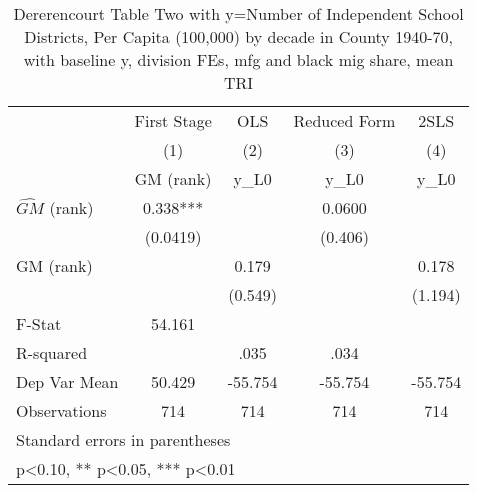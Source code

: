 \begin{table}[htbp]\centering
\def\sym#1{\ifmmode^{#1}\else\(^{#1}\)\fi}
\caption{Dererencourt Table Two with y=Number of Independent School Districts, Per Capita (100,000) by decade in County 1940-70, with baseline y, division FEs, mfg and black mig share, mean TRI}
\begin{tabular}{l*{4}{c}}
\toprule
                    & First Stage   &         OLS   &Reduced Form   &        2SLS   \\
                    &\multicolumn{1}{c}{(1)}&\multicolumn{1}{c}{(2)}&\multicolumn{1}{c}{(3)}&\multicolumn{1}{c}{(4)}\\
                    &\multicolumn{1}{c}{GM  (rank)}&\multicolumn{1}{c}{y\_L0}&\multicolumn{1}{c}{y\_L0}&\multicolumn{1}{c}{y\_L0}\\
\midrule
$\hat{GM}$ (rank)   &       0.338***&               &      0.0600   &               \\
                    &    (0.0419)   &               &     (0.406)   &               \\
\addlinespace
GM  (rank)          &               &       0.179   &               &       0.178   \\
                    &               &     (0.549)   &               &     (1.194)   \\
\midrule
F-Stat              &      54.161   &               &               &               \\
R-squared           &               &        .035   &        .034   &               \\
Dep Var Mean        &      50.429   &     -55.754   &     -55.754   &     -55.754   \\
Observations        &         714   &         714   &         714   &         714   \\
\bottomrule
\multicolumn{5}{l}{\footnotesize Standard errors in parentheses}\\
\multicolumn{5}{l}{\footnotesize * p<0.10, ** p<0.05, *** p<0.01}\\
\end{tabular}
\end{table}
